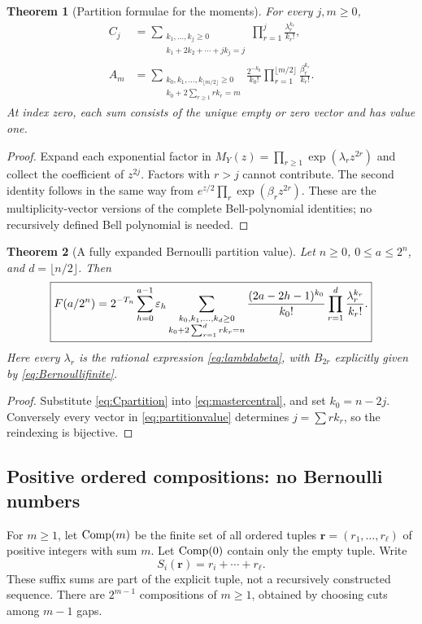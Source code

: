 \documentclass[11pt,oneside]{article}
\newtheorem{theorem}{Theorem}[section]
\theoremstyle{definition}\newtheorem{definition}[theorem]{Definition}
\theoremstyle{remark}\newtheorem{remark}[theorem]{Remark}
\begin{document}
\begin{theorem}[Partition formulae for the moments]
\label{thm:partitioncoeff}
For every $j,m\ge0$,
\begin{align}
 C_j&=\sum_{\substack{k_1,\ldots,k_j\ge0\\
                  k_1+2k_2+\cdots+jk_j=j}}
              \prod_{r=1}^j\frac{\lambda_r^{k_r}}{k_r!},
 \label{eq:Cpartition}\\
 A_m&=\sum_{\substack{k_0,k_1,\ldots,k_{\lfloor m/2\rfloor}\ge0\\
                  k_0+2\sum_{r\ge1}rk_r=m}}
       \frac{2^{-k_0}}{k_0!}
       \prod_{r=1}^{\lfloor m/2\rfloor}\frac{\beta_r^{k_r}}{k_r!}.
 \label{eq:Apartition}
\end{align}
At index zero, each sum consists of the unique empty or zero vector and
has value one.
\end{theorem}
\begin{proof}
Expand each exponential factor in
$M_Y(z)=\prod_{r\ge1}\exp(\lambda_rz^{2r})$ and collect the coefficient of
$z^{2j}$. Factors with $r>j$ cannot contribute. The second identity follows
in the same way from $e^{z/2}\prod_r\exp(\beta_rz^{2r})$. These are the
multiplicity-vector versions of the complete Bell-polynomial identities;
no recursively defined Bell polynomial is needed.
\end{proof}

\begin{theorem}[A fully expanded Bernoulli partition value]
\label{thm:partitionvalue}
Let $n\ge0$, $0\le a\le2^n$, and $d=\lfloor n/2\rfloor$. Then
\begin{equation}
 \boxed{\displaystyle
 F(a/2^n)=2^{-T_n}\sum_{h=0}^{a-1}\varepsilon_h
 \sum_{\substack{k_0,k_1,\ldots,k_d\ge0\\
                 k_0+2\sum_{r=1}^d rk_r=n}}
 \frac{(2a-2h-1)^{k_0}}{k_0!}
 \prod_{r=1}^d\frac{\lambda_r^{k_r}}{k_r!}.}
 \label{eq:partitionvalue}
\end{equation}
Here every $\lambda_r$ is the rational expression \eqref{eq:lambdabeta},
with $B_{2r}$ explicitly given by \eqref{eq:Bernoullifinite}.
\end{theorem}
\begin{proof}
Substitute \eqref{eq:Cpartition} into \eqref{eq:mastercentral}, and set
$k_0=n-2j$. Conversely every vector in \eqref{eq:partitionvalue} determines
$j=\sum rk_r$, so the reindexing is bijective.
\end{proof}

\subsection{Positive ordered compositions: no Bernoulli numbers}
For $m\ge1$, let $\operatorname{Comp}(m)$ be the finite set of all ordered tuples
$\boldsymbol r=(r_1,\ldots,r_\ell)$ of positive integers with sum $m$.
Let $\operatorname{Comp}(0)$ contain only the empty tuple. Write
\begin{equation}
 S_i(\boldsymbol r)=r_i+\cdots+r_\ell.
 \label{eq:suffix}
\end{equation}
These suffix sums are part of the explicit tuple, not a recursively
constructed sequence. There are $2^{m-1}$ compositions of $m\ge1$, obtained
by choosing cuts among $m-1$ gaps.
\end{document}
